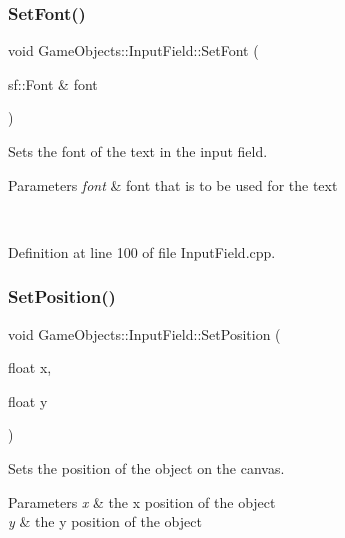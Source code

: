 \subsubsection{\texorpdfstring{SetFont()}{SetFont()}}
{\footnotesize\ttfamily void Game\+Objects\+::\+Input\+Field\+::\+Set\+Font (\begin{DoxyParamCaption}\item[{sf\+::\+Font \&}]{font }\end{DoxyParamCaption})}



Sets the font of the text in the input field. 


\begin{DoxyParams}{Parameters}
{\em font} & font that is to be used for the text \begin{DoxyVerb}\end{DoxyVerb}
 \\
\hline
\end{DoxyParams}


Definition at line 100 of file Input\+Field.\+cpp.


\begin{DoxyCode}{0}

\end{DoxyCode}
\mbox{\label{class_game_objects_1_1_input_field_a6debb6685c52c38129ea39fb3046d3fe}} 
\subsubsection{\texorpdfstring{SetPosition()}{SetPosition()}}
{\footnotesize\ttfamily void Game\+Objects\+::\+Input\+Field\+::\+Set\+Position (\begin{DoxyParamCaption}\item[{float}]{x,  }\item[{float}]{y }\end{DoxyParamCaption})}



Sets the position of the object on the canvas. 


\begin{DoxyParams}{Parameters}
{\em x} & the x position of the object\\
\hline
{\em y} & the y position of the object \begin{DoxyVerb}\end{DoxyVerb}
 \\
\hline
\end{DoxyParams}


